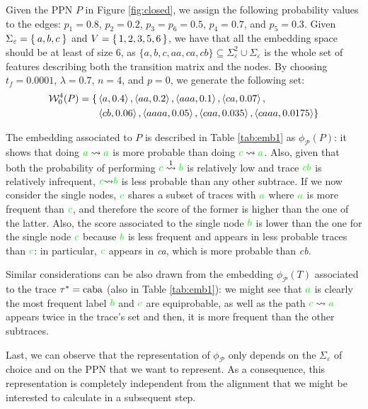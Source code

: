 \begin{example}\label{ex:withpaths}
Given the PPN $P$ in Figure \ref{fig:closed}, we assign the following probability values to the edges: $p_1=0.8$, $p_2=0.2$, $p_3=p_6=0.5$, $p_4=0.7$, and $p_5=0.3$. Given $\Sigma_\varepsilon=\Set{a,b,c}$ and $V=\set{1,2,3,5,6}$, we have that all the embedding space should be at least of size $6$, as $\{a,b,c,aa,ca,cb\}\subseteq \Sigma_\varepsilon^2\cup\Sigma_\varepsilon$ is the whole set of features describing both the transition matrix and the nodes. By choosing $t_f=0.0001$, $\lambda=0.7$, $n=4$, and $p=0$, we generate the following set:
$$\begin{aligned}
\mathcal{W}_0^4(P)=\{&\braket{a,0.4},\braket{aa,0.2},\braket{aaa,0.1},\braket{ca,0.07},\\
&\braket{cb,0.06},\braket{aaaa,0.05},\braket{caa,0.035},\braket{caaa,0.0175}\}\\
\end{aligned}$$


The embedding associated to $P$ is described in Table \ref{tab:emb1} as $\phi_{\mathcal{P}}(P)$: it shows that doing ${\color{green}a}\rightsquigarrow{\color{green}a}$ is more probable than doing  ${\color{green}c}\rightsquigarrow{\color{green}a}$. Also, given that both the probability of performing ${\color{green}c}\overset{1}{\rightsquigarrow}{\color{green}b}$ is relatively low and trace $\color{green}cb$ is relatively infrequent, ${\color{green}c}{\rightsquigarrow}{\color{green}b}$ is less probable than any other subtrace. If we now consider the single nodes, $\color{green}c$ shares a subset of traces with $\color{green}a$ where $\color{green}a$ is more frequent than $\color{green}c$, and therefore the score of the former is higher than the one of the latter. Also, the score associated to the single node $\color{green}b$ is lower than the one for the single node $\color{green}c$ because $\color{green}b$ is less frequent and appears in less probable traces than $\color{green}c$: in particular, $\color{green}c$ appears in \textit{ca}, which is more probable than \textit{cb}.

Similar considerations can be also drawn from the embedding $\phi_{\mathcal{P}}(T)$ associated to the trace $\tau^*=\textup{caba}$ (also in Table \ref{tab:emb1}): we might see that ${\color{green}a}$ is clearly the most frequent label ${\color{green}b}$ and ${\color{green}c}$ are equiprobable, as well as the path ${\color{green}c}\rightsquigarrow {\color{green}a}$ appears twice in the trace's set and then, it is more frequent than the other subtraces.

Last, we can observe that the representation of $\phi_{\mathcal{P}}$ only depends on the $\Sigma_\varepsilon$ of choice and on the PPN that we want to represent. As a consequence, this representation is completely independent from the alignment that we might be interested to calculate in a subsequent step. 
\end{example}

